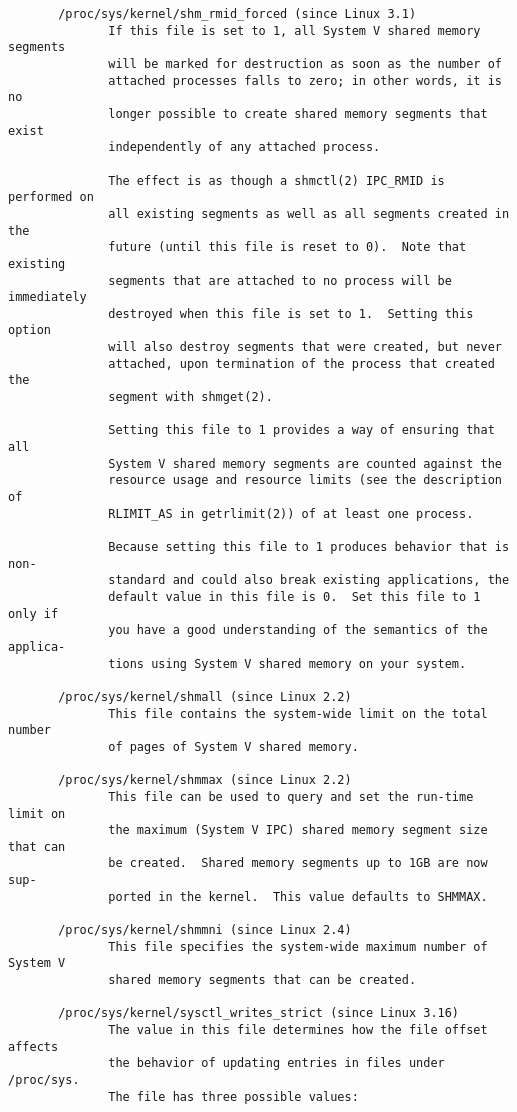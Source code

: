 \documentclass[]{article}
\begin{document}
\begin{verbatim}
       /proc/sys/kernel/shm_rmid_forced (since Linux 3.1)
              If this file is set to 1, all System V shared memory segments
              will be marked for destruction as soon as the number of
              attached processes falls to zero; in other words, it is no
              longer possible to create shared memory segments that exist
              independently of any attached process.

              The effect is as though a shmctl(2) IPC_RMID is performed on
              all existing segments as well as all segments created in the
              future (until this file is reset to 0).  Note that existing
              segments that are attached to no process will be immediately
              destroyed when this file is set to 1.  Setting this option
              will also destroy segments that were created, but never
              attached, upon termination of the process that created the
              segment with shmget(2).

              Setting this file to 1 provides a way of ensuring that all
              System V shared memory segments are counted against the
              resource usage and resource limits (see the description of
              RLIMIT_AS in getrlimit(2)) of at least one process.

              Because setting this file to 1 produces behavior that is non‐
              standard and could also break existing applications, the
              default value in this file is 0.  Set this file to 1 only if
              you have a good understanding of the semantics of the applica‐
              tions using System V shared memory on your system.

       /proc/sys/kernel/shmall (since Linux 2.2)
              This file contains the system-wide limit on the total number
              of pages of System V shared memory.

       /proc/sys/kernel/shmmax (since Linux 2.2)
              This file can be used to query and set the run-time limit on
              the maximum (System V IPC) shared memory segment size that can
              be created.  Shared memory segments up to 1GB are now sup‐
              ported in the kernel.  This value defaults to SHMMAX.

       /proc/sys/kernel/shmmni (since Linux 2.4)
              This file specifies the system-wide maximum number of System V
              shared memory segments that can be created.

       /proc/sys/kernel/sysctl_writes_strict (since Linux 3.16)
              The value in this file determines how the file offset affects
              the behavior of updating entries in files under /proc/sys.
              The file has three possible values:


\end{verbatim}
\end{document}
